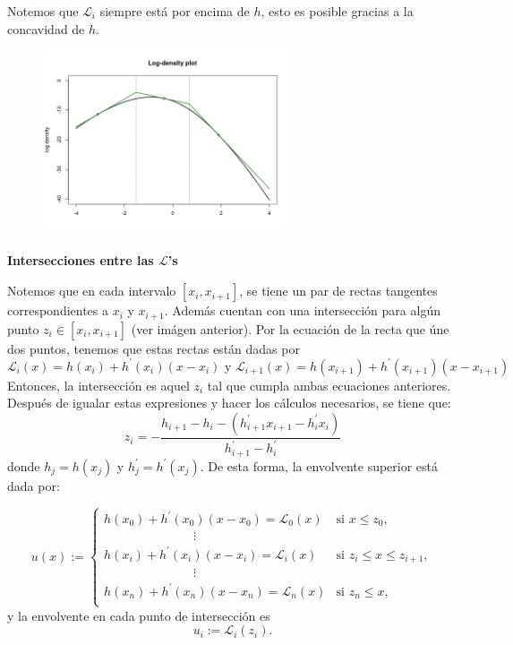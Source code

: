 Notemos que $\mathcal{L}_{i}$ siempre está por encima de $h$, esto es posible gracias a la concavidad de $h$.
\begin{figure}[h!]
	\centering
	\includegraphics[width=0.65\textwidth]{IMAGENES/libro}
\end{figure}

\textbf{Intersecciones entre las $\mathcal{L}$'s}

Notemos que en cada intervalo $[x_i, x_{i+1}]$, se tiene un par de rectas tangentes correspondientes a $x_i$ y $x_{i+1}$. Además cuentan con una intersección para algún punto $z_i\in[x_i, x_{i+1}]$ (ver imágen anterior). Por la ecuación de la recta que úne dos puntos, tenemos que estas rectas están dadas por
\begin{equation}
	\mathcal{L}_{i} (x)= h(x_{i}) + h^{'}(x_{i}) (x - x_{i}) \text{ y } \mathcal{L}_{i+1} (x) =  h(x_{i+1}) + h^{'}(x_{i+1}) (x - x_{i+1})
\end{equation}
Entonces, la intersección es aquel $z_i$ tal que cumpla ambas ecuaciones anteriores. Después de igualar estas expresiones y hacer los cálculos necesarios, se tiene que:
\begin{equation}\label{eq:7}
	z_{i} = -\frac{h_{i+1} - h_{i} - \left(h_{i+1}^{'} x_{i+1} - h_{i}^{'} x_{i}\right)}{h_{i+1}^{'} - h_{i}^{'}}
\end{equation} 
donde $h_{j} = h(x_{j})$ y $h_{j}^{'} = h^{'}(x_{j})$. De esta forma, la envolvente superior está dada por:

$$	
	u(x) :=
	\begin{cases}
		h(x_0) + h^{'}(x_0)(x-x_0) = \mathcal{L}_{0} (x) & \text{si } x \leq z_0, \\
		\hspace{3cm}\vdots \\
		h(x_i) + h^{'}(x_i)(x-x_i) = \mathcal{L}_{i} (x) & \text{si } z_{i} \leq x \leq z_{i+1}, \\
		\hspace{3cm}\vdots \\
		h(x_n) + h^{'}(x_n)(x-x_n) = \mathcal{L}_{n} (x) & \text{si } z_n \leq x, \\
	\end{cases}
$$
y la envolvente en cada punto de intersección es
\begin{equation} \label{eq:8}
	u_{i} := \mathcal{L}_{i} (z_{i}).
\end{equation} 


